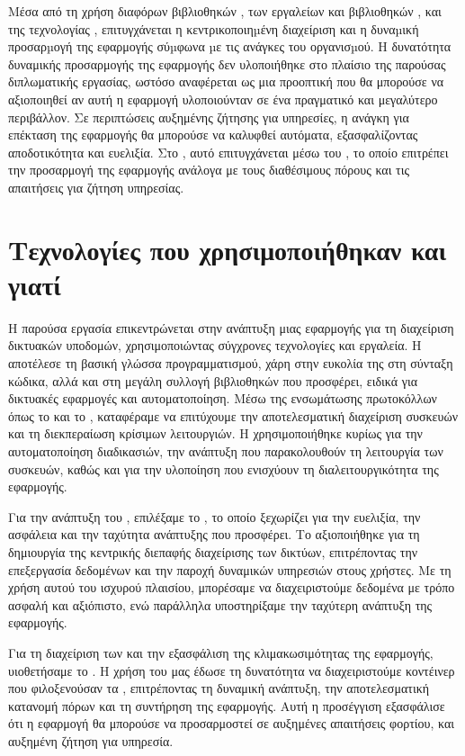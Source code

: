 Μέσα από τη χρήση διαφόρων βιβλιοθηκών , των εργαλείων και βιβλιοθηκών , και της τεχνολογίας , επιτυγχάνεται η κεντρικοποιηµένη διαχείριση και η δυναµική προσαρµογή της εφαρμογής σύµφωνα µε τις ανάγκες του οργανισµού. Η δυνατότητα δυναμικής προσαρμογής της εφαρμογής δεν υλοποιήθηκε στο πλαίσιο της παρούσας διπλωματικής εργασίας, ωστόσο αναφέρεται ως μια προοπτική που θα μπορούσε να αξιοποιηθεί αν αυτή η εφαρμογή υλοποιούνταν σε ένα πραγματικό και μεγαλύτερο περιβάλλον. Σε περιπτώσεις αυξημένης ζήτησης για υπηρεσίες, η ανάγκη για επέκταση της εφαρμογής θα μπορούσε να καλυφθεί αυτόματα, εξασφαλίζοντας αποδοτικότητα και ευελιξία. Στο , αυτό επιτυγχάνεται μέσω του , το οποίο επιτρέπει την προσαρμογή της εφαρμογής ανάλογα με τους διαθέσιμους πόρους και τις απαιτήσεις για ζήτηση υπηρεσίας.  

\section{Τεχνολογίες που χρησιμοποιήθηκαν και γιατί}



Η παρούσα εργασία επικεντρώνεται στην ανάπτυξη μιας εφαρμογής 
για τη διαχείριση δικτυακών υποδομών, χρησιμοποιώντας σύγχρονες 
τεχνολογίες και εργαλεία. Η  αποτέλεσε τη βασική γλώσσα 
προγραμματισμού, χάρη στην ευκολία της στη σύνταξη κώδικα, αλλά και 
στη μεγάλη συλλογή βιβλιοθηκών που προσφέρει, ειδικά για δικτυακές 
εφαρμογές και αυτοματοποίηση. Μέσω της ενσωμάτωσης πρωτοκόλλων όπως 
το  και το , καταφέραμε να επιτύχουμε την 
αποτελεσματική διαχείριση συσκευών και τη διεκπεραίωση κρίσιμων 
λειτουργιών. Η  χρησιμοποιήθηκε κυρίως για την 
αυτοματοποίηση διαδικασιών, την ανάπτυξη  που 
παρακολουθούν τη λειτουργία των συσκευών, καθώς και για την 
υλοποίηση  που ενισχύουν τη διαλειτουργικότητα της εφαρμογής.

Για την ανάπτυξη του , επιλέξαμε το , 
το οποίο ξεχωρίζει για την ευελιξία, την ασφάλεια και την 
ταχύτητα ανάπτυξης που προσφέρει. Το  
αξιοποιήθηκε για τη δημιουργία της κεντρικής διεπαφής διαχείρισης 
των δικτύων, επιτρέποντας την επεξεργασία δεδομένων και 
την παροχή δυναμικών υπηρεσιών στους χρήστες. Με τη χρήση αυτού 
του ισχυρού πλαισίου, μπορέσαμε να διαχειριστούμε δεδομένα με 
τρόπο ασφαλή και αξιόπιστο, ενώ παράλληλα υποστηρίξαμε την ταχύτερη 
ανάπτυξη της εφαρμογής.

Για τη διαχείριση των  και την εξασφάλιση της 
κλιμακωσιμότητας της εφαρμογής, υιοθετήσαμε το . 
Η χρήση του  μας έδωσε τη δυνατότητα να 
διαχειριστούμε κοντέινερ που φιλοξενούσαν τα , 
επιτρέποντας τη δυναμική ανάπτυξη, την αποτελεσματική κατανομή πόρων 
και τη συντήρηση της εφαρμογής. Αυτή η προσέγγιση εξασφάλισε ότι η 
εφαρμογή θα μπορούσε να προσαρμοστεί σε αυξημένες απαιτήσεις φορτίου, 
και αυξημένη ζήτηση για υπηρεσία.

